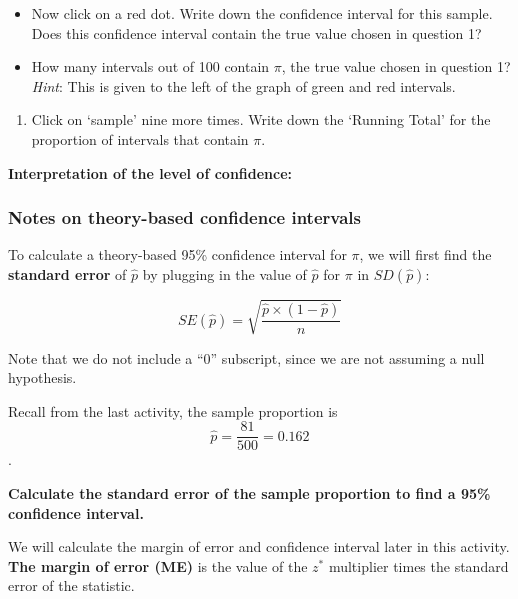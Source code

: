 \documentclass[
]{report}
\providecommand{\tightlist}{%
  \setlength{\itemsep}{0pt}\setlength{\parskip}{0pt}}
\begin{document}
\begin{itemize}
\item
  Now click on a red dot. Write down the confidence interval for this sample. Does this confidence interval contain the true value chosen in question 1?
  \vspace{0.5in}
\item
  How many intervals out of 100 contain \(\pi\), the true value chosen in question 1? \emph{Hint}: This is given to the left of the graph of green and red intervals.
  \vspace{0.4in}
\end{itemize}

\begin{enumerate}
\def\labelenumi{\arabic{enumi}.}
\setcounter{enumi}{2}
\tightlist
\item
  Click on `sample' nine more times. Write down the `Running Total' for the proportion of intervals that contain \(\pi\).
\end{enumerate}

\vspace{0.5in}

\textbf{Interpretation of the level of confidence:}

\vspace{0.8in}

\subsubsection*{Notes on theory-based confidence intervals}\label{notes-on-theory-based-confidence-intervals}

To calculate a theory-based 95\% confidence interval for \(\pi\), we will first find the \textbf{standard error} of \(\hat{p}\) by plugging in the value of \(\hat{p}\) for \(\pi\) in \(SD(\hat{p})\):

\[SE(\hat{p}) = \sqrt{\frac{\hat{p}\times (1-\hat{p})}{n}}\]

Note that we do not include a ``0'' subscript, since we are not assuming a null hypothesis.

Recall from the last activity, the sample proportion is \[\hat{p}=\frac{81}{500}=0.162\].

\textbf{Calculate the standard error of the sample proportion to find a 95\% confidence interval.}

\vspace{0.5in}

We will calculate the margin of error and confidence interval later in this activity. \textbf{The margin of error (ME)} is the value of the \(z^*\) multiplier times the standard error of the statistic.
\end{document}
